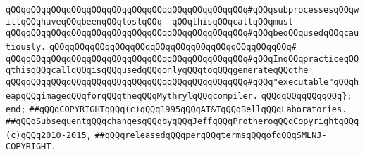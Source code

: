 \verb|qQQqqQQqqQQqqQQqqQQqqQQqqQQqqQQqqQQqqQQqqQQqqQQq#qQQqsubprocessesqQQqwillqQQqhaveqQQqbeenqQQqlostqQQq--qQQqthisqQQqcallqQQqmust|\newline
\verb|qQQqqQQqqQQqqQQqqQQqqQQqqQQqqQQqqQQqqQQqqQQqqQQq#qQQqbeqQQqusedqQQqcautiously.|\newline
\verb|qQQqqQQqqQQqqQQqqQQqqQQqqQQqqQQqqQQqqQQqqQQqqQQq#|\newline
\verb|qQQqqQQqqQQqqQQqqQQqqQQqqQQqqQQqqQQqqQQqqQQqqQQq#qQQqInqQQqpracticeqQQqthisqQQqcallqQQqisqQQqusedqQQqonlyqQQqtoqQQqgenerateqQQqthe|\newline
\verb|qQQqqQQqqQQqqQQqqQQqqQQqqQQqqQQqqQQqqQQqqQQqqQQq#qQQq"executable"qQQqheapqQQqimageqQQqforqQQqtheqQQqMythrylqQQqcompiler.|\newline
\verb|qQQqqQQqqQQqqQQq};|\newline
\verb|end;|\newline
\newline
\newline
\newline
\verb|##qQQqCOPYRIGHTqQQq(c)qQQq1995qQQqAT&TqQQqBellqQQqLaboratories.|\newline
\verb|##qQQqSubsequentqQQqchangesqQQqbyqQQqJeffqQQqProtheroqQQqCopyrightqQQq(c)qQQq2010-2015,|\newline
\verb|##qQQqreleasedqQQqperqQQqtermsqQQqofqQQqSMLNJ-COPYRIGHT.|\newline


